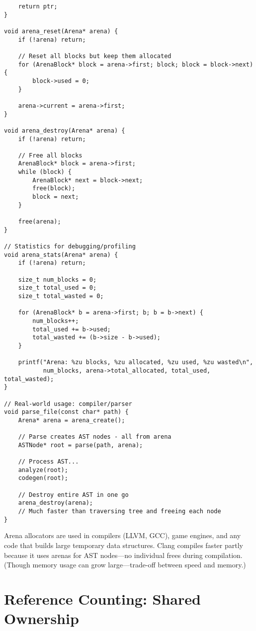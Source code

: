 \begin{lstlisting}
    return ptr;
}

void arena_reset(Arena* arena) {
    if (!arena) return;

    // Reset all blocks but keep them allocated
    for (ArenaBlock* block = arena->first; block; block = block->next) {
        block->used = 0;
    }

    arena->current = arena->first;
}

void arena_destroy(Arena* arena) {
    if (!arena) return;

    // Free all blocks
    ArenaBlock* block = arena->first;
    while (block) {
        ArenaBlock* next = block->next;
        free(block);
        block = next;
    }

    free(arena);
}

// Statistics for debugging/profiling
void arena_stats(Arena* arena) {
    if (!arena) return;

    size_t num_blocks = 0;
    size_t total_used = 0;
    size_t total_wasted = 0;

    for (ArenaBlock* b = arena->first; b; b = b->next) {
        num_blocks++;
        total_used += b->used;
        total_wasted += (b->size - b->used);
    }

    printf("Arena: %zu blocks, %zu allocated, %zu used, %zu wasted\n",
           num_blocks, arena->total_allocated, total_used, total_wasted);
}

// Real-world usage: compiler/parser
void parse_file(const char* path) {
    Arena* arena = arena_create();

    // Parse creates AST nodes - all from arena
    ASTNode* root = parse(path, arena);

    // Process AST...
    analyze(root);
    codegen(root);

    // Destroy entire AST in one go
    arena_destroy(arena);
    // Much faster than traversing tree and freeing each node
}
\end{lstlisting}

\begin{notebox}
Arena allocators are used in compilers (LLVM, GCC), game engines, and any code that builds large temporary data structures. Clang compiles faster partly because it uses arenas for AST nodes—no individual frees during compilation. (Though memory usage can grow large—trade-off between speed and memory.)
\end{notebox}

\section{Reference Counting: Shared Ownership}

